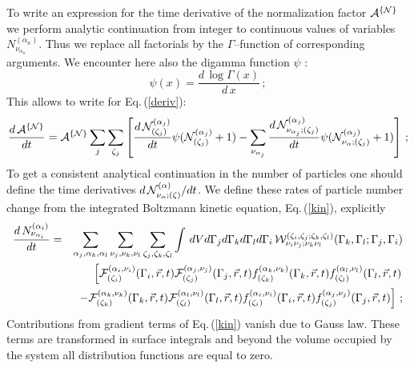 \documentclass[a4paper,11pt]{article}
\begin{document}
To write an expression for the time derivative of the
normalization factor ${\cal A}^{\{{\cal N}\}}$ we perform analytic
continuation from integer to continuous values of variables
$N^{(\alpha_n)}_{\nu_{\alpha_n}}.$ Thus we replace all factorials
by the $\Gamma$--function  of corresponding arguments. We
encounter here also the digamma function $\psi$ \cite{Abram}:
\begin{equation}\label{digamma}
\psi(x)=\frac{d\, \log\Gamma(x)}{d\,x}\,;
\end{equation}
This allows to write for Eq.\,(\ref{deriv}):
\begin{equation}\label{evfactor}
\frac{d\,{\cal A}^{\{{\cal N}\}}}{dt} = {\cal A}^{\{{\cal
N}\}}\sum_j\sum_{\zeta_j}
 \left[\frac{d\,{\cal N}^{(\alpha_j)}_{(\zeta_j)}}{dt}
 \psi({\cal N}^{(\alpha_j)}_{(\zeta_j)}+1) -\sum_{\nu_{\alpha_j}}
\frac{d\,{\cal N}^{(\alpha_j)}_{\nu_{\alpha_j};(\zeta_j)}}{dt}
\psi({\cal N}^{(\alpha_j)}_{\nu_\alpha;(\zeta_j)}+1)\right]\,;
\end{equation}
To get a consistent analytical continuation in the number of
particles one should define the time derivatives ${d\,{\cal
N}^{(\alpha)}_{\nu_\alpha;(\zeta)}}/{dt}$. We define these  rates
of particle number change from the integrated Boltzmann kinetic
equation, Eq.\,(\ref{kin}), explicitly
\begin{eqnarray}\label{change}
\frac{d\,N^{(\alpha_i)}_{\nu_{\alpha_i}}}{dt}
&=&\sum_{\alpha_j,\alpha_k,\alpha_l}\sum_{\nu_j,\nu_k,\nu_l}
\sum_{\zeta_j,\zeta_k,\zeta_l} \int\,dV d\Gamma_j d\Gamma_k
d\Gamma_l d\Gamma_i\, {\cal
W}_{\nu_i\nu_j;\nu_k\nu_l}^{(\zeta_i,\zeta_j;\zeta_k,\zeta_l)}
(\Gamma_k,\Gamma_l;\Gamma_j,\Gamma_i)\nonumber\\ &\ & \left[ {\cal
F}^{(\alpha_i,\nu_i)}_{(\zeta_i)}(\Gamma_i,\vec r,t)
       {\cal F}^{(\alpha_j,\nu_j)}_{(\zeta_j)}(\Gamma_j,\vec r,t)
              f^{(\alpha_k,\nu_k)}_{(\zeta_k)}(\Gamma_k,\vec r,t)
              f^{(\alpha_l,\nu_l)}_{(\zeta_l)}(\Gamma_l,\vec r,t)
\right.\nonumber\\&&\left.
      -{\cal F}^{(\alpha_k,\nu_k)}_{(\zeta_k)}(\Gamma_k,\vec r,t)
       {\cal F}^{(\alpha_l,\nu_l)}_{(\zeta_l)}(\Gamma_l,\vec r,t)
              f^{(\alpha_i,\nu_i)}_{(\zeta_i)}(\Gamma_i,\vec r,t)
              f^{(\alpha_j,\nu_j)}_{(\zeta_j)}(\Gamma_j,\vec r,t)
\right]\,;
\end{eqnarray}
Contributions from gradient terms of Eq.\,(\ref{kin}) vanish due
to Gauss law. These terms are transformed  in surface integrals
and beyond the volume occupied by the system all distribution
functions are equal to zero.
\end{document}
